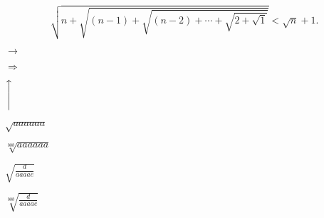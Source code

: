\mathfonttest


  \[ \sqrt{n+\sqrt{(n-1)+\sqrt{(n-2)+\dotsb+\sqrt{2+\sqrt{1}}}}}<\sqrt{n}+1. \]
  
$\longrightarrow$

$\Longrightarrow$

$\Bigg\uparrow$

$\sqrt{aaaaaa}$

$\sqrt[bbb]{aaaaaa}$

$\sqrt{\frac{d}{aaaae}}$

$\sqrt[bbb]{\frac{d}{aaaae}}$



%

%

%
%
%




%


\meaning\Relbar

